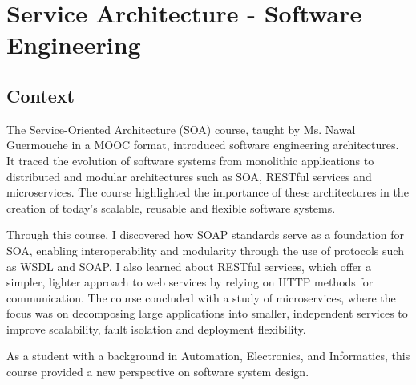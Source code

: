 \section{Service Architecture - Software Engineering}
\subsection{Context}

\indent \indent The Service-Oriented Architecture (SOA) course, taught by Ms. Nawal Guermouche in a MOOC format, introduced software engineering architectures.
It traced the evolution of software systems from monolithic applications to distributed and modular architectures such as SOA, RESTful services and microservices.
The course highlighted the importance of these architectures in the creation of today's scalable, reusable and flexible software systems.

\indent Through this course, I discovered how SOAP standards serve as a foundation for SOA, enabling interoperability and modularity through the use of protocols such as WSDL and SOAP. 
I also learned about RESTful services, which offer a simpler, lighter approach to web services by relying on HTTP methods for communication. 
The course concluded with a study of microservices, where the focus was on decomposing large applications into smaller, independent services to improve scalability, fault isolation and deployment flexibility.

\indent As a student with a background in Automation, Electronics, and Informatics, this course provided a new perspective on software system design. 

